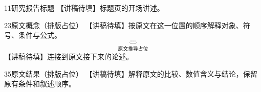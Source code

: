 \begin{ReportSlide}{1}{1}{研究报告标题}{}
【讲稿待填】标题页的开场讲述。
\end{ReportSlide}

\begin{ReportSlide}{2}{3}{原文概念（排版占位）}{}
【讲稿待填】按原文在这一位置的顺序解释对象、符号、条件与公式。
\[
\underbrace{\cdots}_{\text{原文推导占位}}
\]
【讲稿待填】连接到原文接下来的论述。
\end{ReportSlide}

\begin{ReportSlide}{3}{5}{原文结果（排版占位）}{}
【讲稿待填】解释原文的比较、数值含义与结论，保留原有条件和叙述顺序。
\end{ReportSlide}
